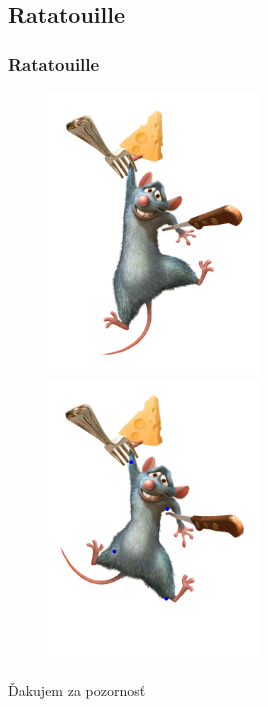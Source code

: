 \documentclass[a4paper]{beamer}
\begin{document}
\subsection{Ratatouille}
\begin{frame}
	\frametitle{Ratatouille}
	\begin{figure}
		\centering
		\includegraphics[width=0.5\textwidth,keepaspectratio]{pic/results/ratatouille1}
		\includegraphics[width=0.5\textwidth,keepaspectratio]{pic/results/ratatouille2}
	\end{figure}
\end{frame}

\begin{frame}
	\vspace*{\fill}
	\begin{center}
		\Large Ďakujem za pozornosť
	\end{center}
	\vfill
\end{frame}
\end{document}
